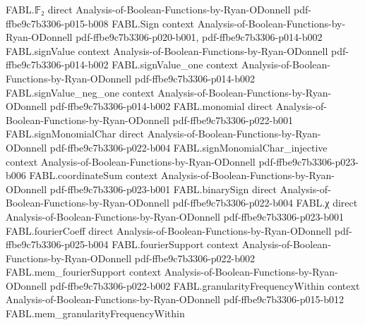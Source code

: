 \begin{theorem}
\label{FABL.vectorFourierCoeff_setIndicator_submodule_of_not_mem}
\leanok
{}
\proofstep
  {FABL.𝔽₂}
  {direct}
  {Analysis-of-Boolean-Functions-by-Ryan-ODonnell}
  {pdf-ffbe9c7b3306-p015-b008}
\proofstep
  {FABL.Sign}
  {context}
  {Analysis-of-Boolean-Functions-by-Ryan-ODonnell}
  {pdf-ffbe9c7b3306-p020-b001,
    pdf-ffbe9c7b3306-p014-b002}
\proofstep
  {FABL.signValue}
  {context}
  {Analysis-of-Boolean-Functions-by-Ryan-ODonnell}
  {pdf-ffbe9c7b3306-p014-b002}
\proofstep
  {FABL.signValue_one}
  {context}
  {Analysis-of-Boolean-Functions-by-Ryan-ODonnell}
  {pdf-ffbe9c7b3306-p014-b002}
\proofstep
  {FABL.signValue_neg_one}
  {context}
  {Analysis-of-Boolean-Functions-by-Ryan-ODonnell}
  {pdf-ffbe9c7b3306-p014-b002}
\proofstep
  {FABL.monomial}
  {direct}
  {Analysis-of-Boolean-Functions-by-Ryan-ODonnell}
  {pdf-ffbe9c7b3306-p022-b001}
\proofstep
  {FABL.signMonomialChar}
  {direct}
  {Analysis-of-Boolean-Functions-by-Ryan-ODonnell}
  {pdf-ffbe9c7b3306-p022-b004}
\proofstep
  {FABL.signMonomialChar_injective}
  {context}
  {Analysis-of-Boolean-Functions-by-Ryan-ODonnell}
  {pdf-ffbe9c7b3306-p023-b006}
\proofstep
  {FABL.coordinateSum}
  {context}
  {Analysis-of-Boolean-Functions-by-Ryan-ODonnell}
  {pdf-ffbe9c7b3306-p023-b001}
\proofstep
  {FABL.binarySign}
  {direct}
  {Analysis-of-Boolean-Functions-by-Ryan-ODonnell}
  {pdf-ffbe9c7b3306-p022-b004}
\proofstep
  {FABL.χ}
  {direct}
  {Analysis-of-Boolean-Functions-by-Ryan-ODonnell}
  {pdf-ffbe9c7b3306-p023-b001}
\proofstep
  {FABL.fourierCoeff}
  {direct}
  {Analysis-of-Boolean-Functions-by-Ryan-ODonnell}
  {pdf-ffbe9c7b3306-p025-b004}
\proofstep
  {FABL.fourierSupport}
  {context}
  {Analysis-of-Boolean-Functions-by-Ryan-ODonnell}
  {pdf-ffbe9c7b3306-p022-b002}
\proofstep
  {FABL.mem_fourierSupport}
  {context}
  {Analysis-of-Boolean-Functions-by-Ryan-ODonnell}
  {pdf-ffbe9c7b3306-p022-b002}
\proofstep
  {FABL.granularityFrequencyWithin}
  {context}
  {Analysis-of-Boolean-Functions-by-Ryan-ODonnell}
  {pdf-ffbe9c7b3306-p015-b012}
\proofstep
  {FABL.mem_granularityFrequencyWithin}

\end{theorem}
